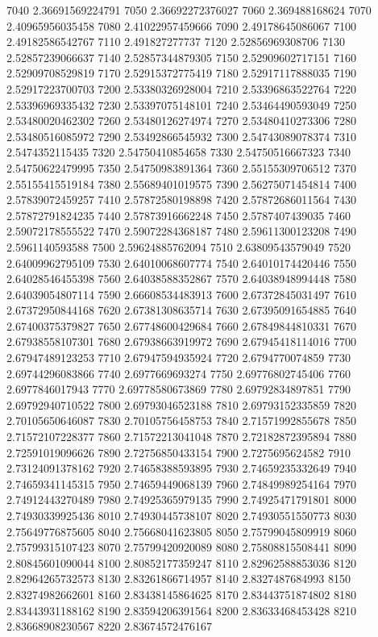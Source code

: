 {7040 2.36691569224791
7050 2.36692272376027
7060 2.369488168624
7070 2.40965956035458
7080 2.41022957459666
7090 2.49178645086067
7100 2.49182586542767
7110 2.491827277737
7120 2.52856969308706
7130 2.52857239066637
7140 2.52857344879305
7150 2.52909602717151
7160 2.52909708529819
7170 2.52915372775419
7180 2.52917117888035
7190 2.52917223700703
7200 2.53380326928004
7210 2.53396863522764
7220 2.53396969335432
7230 2.53397075148101
7240 2.53464490593049
7250 2.53480020462302
7260 2.53480126274974
7270 2.53480410273306
7280 2.53480516085972
7290 2.53492866545932
7300 2.54743089078374
7310 2.5474352115435
7320 2.54750410854658
7330 2.54750516667323
7340 2.54750622479995
7350 2.54750983891364
7360 2.55155309706512
7370 2.55155415519184
7380 2.55689401019575
7390 2.56275071454814
7400 2.57839072459257
7410 2.57872580198898
7420 2.57872686011564
7430 2.57872791824235
7440 2.57873916662248
7450 2.5787407439035
7460 2.59072178555522
7470 2.59072284368187
7480 2.59611300123208
7490 2.5961140593588
7500 2.59624885762094
7510 2.63809543579049
7520 2.64009962795109
7530 2.64010068607774
7540 2.64010174420446
7550 2.64028546455398
7560 2.64038588352867
7570 2.64038948994448
7580 2.64039054807114
7590 2.66608534483913
7600 2.67372845031497
7610 2.67372950844168
7620 2.67381308635714
7630 2.67395091654885
7640 2.67400375379827
7650 2.67748600429684
7660 2.67849844810331
7670 2.67938558107301
7680 2.67938663919972
7690 2.67945418114016
7700 2.67947489123253
7710 2.67947594935924
7720 2.6794770074859
7730 2.69744296083866
7740 2.6977669693274
7750 2.69776802745406
7760 2.6977846017943
7770 2.69778580673869
7780 2.69792834897851
7790 2.69792940710522
7800 2.69793046523188
7810 2.69793152335859
7820 2.70105650646087
7830 2.70105756458753
7840 2.71571992855678
7850 2.71572107228377
7860 2.71572213041048
7870 2.72182872395894
7880 2.72591019096626
7890 2.72756850433154
7900 2.7275695624582
7910 2.73124091378162
7920 2.74658388593895
7930 2.74659235332649
7940 2.74659341145315
7950 2.74659449068139
7960 2.74849989254164
7970 2.74912443270489
7980 2.74925365979135
7990 2.74925471791801
8000 2.74930339925436
8010 2.74930445738107
8020 2.74930551550773
8030 2.75649776875605
8040 2.75668041623805
8050 2.75799045809919
8060 2.75799315107423
8070 2.75799420920089
8080 2.75808815508441
8090 2.80845601090044
8100 2.80852177359247
8110 2.82962588853036
8120 2.82964265732573
8130 2.83261866714957
8140 2.8327487684993
8150 2.83274982662601
8160 2.83438145864625
8170 2.83443751874802
8180 2.83443931188162
8190 2.83594206391564
8200 2.83633468453428
8210 2.83668908230567
8220 2.83674572476167
}
